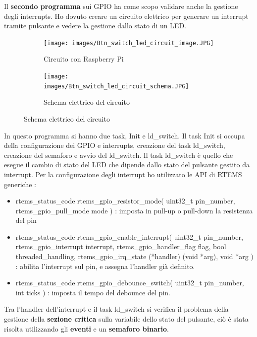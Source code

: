 \documentclass[12pt, a4paper, titlepage, oneside]{book}
\begin{document}
\begin{flushleft}
\begin{lstlisting}[style = CStyle]
\end{lstlisting}
\newpage
Il \textbf{secondo programma} sui GPIO ha come scopo validare anche la gestione degli interrupts. 
Ho dovuto creare un circuito elettrico per generare un interrupt tramite pulsante e vedere la gestione dallo stato di un LED.\\
\begin{figure}[h]
\begin{subfigure}{0.5\textwidth}
\texttt{[image: images/Btn\_switch\_led\_circuit\_image.JPG]}
\caption{Circuito con Raspberry Pi}
\label{fig:Circuito con Raspberry Pi}
\end{subfigure}
\begin{subfigure}{0.5\textwidth}
\texttt{[image: images/Btn\_switch\_led\_circuit\_schema.JPG]}
\caption{Schema elettrico del circuito}
\label{fig:Schema elettrico del circuito}
\end{subfigure}
\end{figure}
In questo programma si hanno due task, Init e ld\_switch.
Il task Init si occupa della configurazione dei GPIO e interrupts, creazione del task ld\_switch, creazione del semaforo e avvio del ld\_switch.
Il task ld\_switch è quello che esegue il cambio di stato del LED che dipende dallo stato del pulsante gestito da interrupt.
Per la configurazione degli interrupt ho utilizzato le API di RTEMS generiche :
\begin{itemize}
    \item rtems\_status\_code rtems\_gpio\_resistor\_mode(
  uint32\_t pin\_number,
   rtems\_gpio\_pull\_mode mode
) : imposta in pull-up o pull-down la resistenza del pin
    \item rtems\_status\_code rtems\_gpio\_enable\_interrupt(
  uint32\_t pin\_number,
  rtems\_gpio\_interrupt interrupt,
  rtems\_gpio\_handler\_flag flag,
  bool threaded\_handling,
  rtems\_gpio\_irq\_state (*handler) (void *arg),
  void *arg
) : abilita l'interrupt sul pin, e assegna l'handler già definito.
    \item rtems\_status\_code rtems\_gpio\_debounce\_switch(
  uint32\_t pin\_number,
  int ticks
) : imposta il tempo del debounce del pin. 
\end{itemize}
Tra l'handler dell'interrupt e il task ld\_switch si verifica il problema della gestione della \textbf{sezione critica} sulla variabile dello stato del pulsante, ciò è stata risolta utilizzando gli \textbf{eventi} e un \textbf{semaforo binario}.\\

\end{flushleft}
\end{document}
